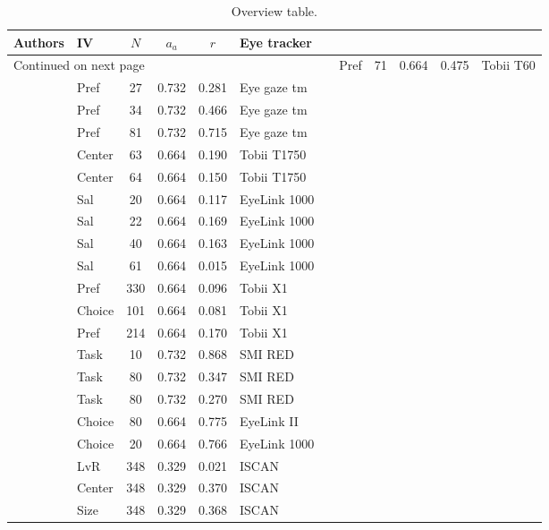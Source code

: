 \begin{longtable}{p{8cm}lcccl}
\caption{Overview table.} \\ 
  \hline
Authors & IV & $N$ & $a_a$ & $r$ & Eye tracker \\ 
  \hline
\endhead
\hline
\multicolumn{7}{l}{\footnotesize Continued on next page}
\endfoot
\endlastfoot
 \hline
\cite{ares2014} & Pref & 71 & 0.664 & 0.475 & Tobii T60 \\ 
  \cite{ashby2015} & Pref & 27 & 0.732 & 0.281 & Eye gaze tm \\ 
  \cite{ashby2015} & Pref & 34 & 0.732 & 0.466 & Eye gaze tm \\ 
  \cite{ashby2015} & Pref & 81 & 0.732 & 0.715 & Eye gaze tm \\ 
  \cite{atalay2012a} & Center & 63 & 0.664 & 0.190 & Tobii T1750 \\ 
  \cite{atalay2012a} & Center & 64 & 0.664 & 0.150 & Tobii T1750 \\ 
  \cite{bagger2016} & Sal & 20 & 0.664 & 0.117 & EyeLink 1000 \\ 
  \cite{bagger2016} & Sal & 22 & 0.664 & 0.169 & EyeLink 1000 \\ 
  \cite{bagger2016} & Sal & 40 & 0.664 & 0.163 & EyeLink 1000 \\ 
  \cite{bagger2016} & Sal & 61 & 0.664 & 0.015 & EyeLink 1000 \\ 
  \cite{behe2014} & Pref & 330 & 0.664 & 0.096 & Tobii X1 \\ 
  \cite{behe2015} & Choice & 101 & 0.664 & 0.081 & Tobii X1 \\ 
  \cite{behe2017} & Pref & 214 & 0.664 & 0.170 & Tobii X1 \\ 
  \cite{bialkova2011} & Task & 10 & 0.732 & 0.868 & SMI RED \\ 
  \cite{bialkova2014a} & Task & 80 & 0.732 & 0.347 & SMI RED \\ 
  \cite{bialkova2014a} & Task & 80 & 0.732 & 0.270 & SMI RED \\ 
  \cite{brandstatter2014} & Choice & 80 & 0.664 & 0.775 & EyeLink II \\ 
  \cite{cavanagh2014} & Choice & 20 & 0.664 & 0.766 & EyeLink 1000 \\ 
  \cite{chandon2009a} & LvR & 348 & 0.329 & 0.021 & ISCAN \\ 
  \cite{chandon2009a} & Center & 348 & 0.329 & 0.370 & ISCAN \\ 
  \cite{chandon2009a} & Size & 348 & 0.329 & 0.368 & ISCAN \\ 

\end{longtable}
